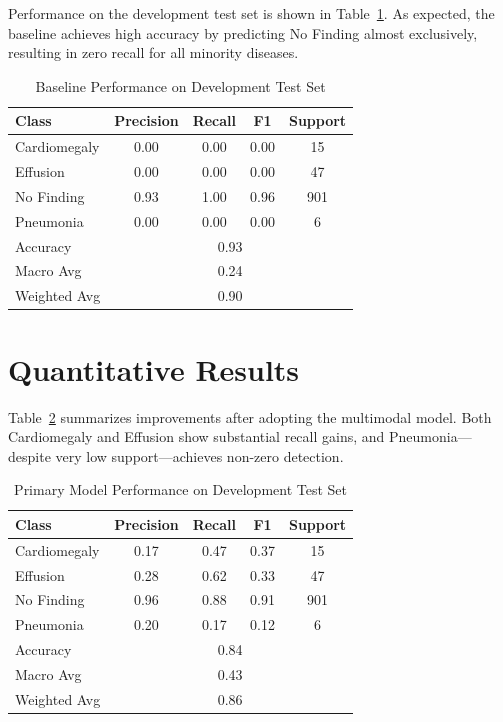 \documentclass[final]{article}
\begin{document}
Performance on the development test set is shown in Table~\ref{tab:baseline}. As expected, the baseline achieves high accuracy by predicting No Finding almost exclusively, resulting in zero recall for all minority diseases.

\begin{table}[h]
\centering
\caption{Baseline Performance on Development Test Set}
\label{tab:baseline}
\begin{tabular}{lcccc}
\hline
Class & Precision & Recall & F1 & Support \\
\hline
Cardiomegaly & 0.00 & 0.00 & 0.00 & 15 \\
Effusion & 0.00 & 0.00 & 0.00 & 47 \\
No Finding & 0.93 & 1.00 & 0.96 & 901 \\
Pneumonia & 0.00 & 0.00 & 0.00 & 6 \\
\hline
Accuracy & \multicolumn{4}{c}{0.93} \\
Macro Avg & \multicolumn{4}{c}{0.24} \\
Weighted Avg & \multicolumn{4}{c}{0.90} \\
\hline
\end{tabular}
\end{table}

\section{Quantitative Results}
Table~\ref{tab:improved-dev} summarizes improvements after adopting the multimodal model. Both Cardiomegaly and Effusion show substantial recall gains, and Pneumonia—despite very low support—achieves non-zero detection.

\begin{table}[h]
\centering
\caption{Primary Model Performance on Development Test Set}
\label{tab:improved-dev}
\begin{tabular}{lcccc}
\hline
Class & Precision & Recall & F1 & Support \\
\hline
Cardiomegaly & 0.17 & 0.47 & 0.37 & 15 \\
Effusion & 0.28 & 0.62 & 0.33 & 47 \\
No Finding & 0.96 & 0.88 & 0.91 & 901 \\
Pneumonia & 0.20 & 0.17 & 0.12 & 6 \\
\hline
Accuracy & \multicolumn{4}{c}{0.84} \\
Macro Avg & \multicolumn{4}{c}{0.43} \\
Weighted Avg & \multicolumn{4}{c}{0.86} \\
\hline
\end{tabular}
\end{table}
\end{document}
